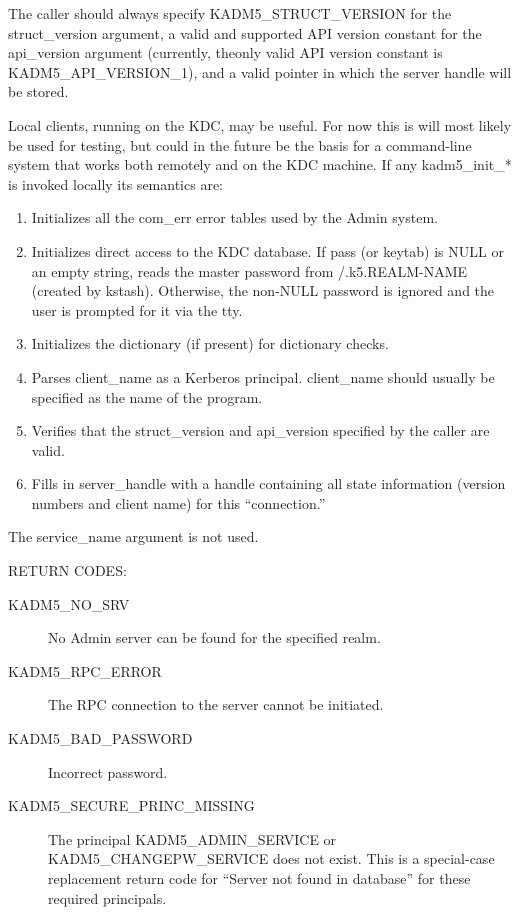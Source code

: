 The caller should always specify KADM5_STRUCT_VERSION for the
struct_version argument, a valid and supported API version constant
for the api_version argument (currently, theonly valid API version
constant is KADM5_API_VERSION_1), and a valid pointer in which
the server handle will be stored.

Local clients, running on the KDC, may be useful. For now this is will
most likely be used for testing, but could in the future be the basis
for a command-line system that works both remotely and on the KDC
machine.  If any kadm5_init_* is invoked locally its semantics are:

\begin{enumerate}
\item Initializes all the com_err error tables used by the Admin
system.

\item Initializes direct access to the KDC database.  If pass (or
keytab) is NULL or an empty string, reads the master password from
/.k5.REALM-NAME (created by kstash).  Otherwise, the non-NULL password
is ignored and the user is prompted for it via the tty.

\item Initializes the dictionary (if present) for dictionary checks.

\item Parses client_name as a Kerberos principal.  client_name should
usually be specified as the name of the program.

\item Verifies that the struct_version and api_version specified by
the caller are valid.

\item Fills in server_handle with a handle containing all state
information (version numbers and client name) for this ``connection.''
\end{enumerate}
The service_name argument is not used.

RETURN CODES: 

\begin{description}
\item[KADM5_NO_SRV] No Admin server can be found for the
specified realm.

\item[KADM5_RPC_ERROR] The RPC connection to the server cannot be
initiated.

\item[KADM5_BAD_PASSWORD] Incorrect password.

\item[KADM5_SECURE_PRINC_MISSING] The principal
KADM5_ADMIN_SERVICE or KADM5_CHANGEPW_SERVICE does not
exist.  This is a special-case replacement return code for ``Server
not found in database'' for these required principals.

\end{description}


